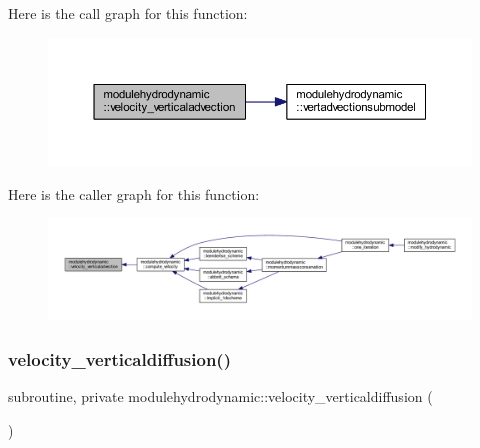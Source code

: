 Here is the call graph for this function\+:\nopagebreak
\begin{figure}[H]
\begin{center}
\leavevmode
\includegraphics[width=350pt]{namespacemodulehydrodynamic_ac07b9cc801de5e329ae0bf6d2bc4783b_cgraph}
\end{center}
\end{figure}
Here is the caller graph for this function\+:\nopagebreak
\begin{figure}[H]
\begin{center}
\leavevmode
\includegraphics[width=350pt]{namespacemodulehydrodynamic_ac07b9cc801de5e329ae0bf6d2bc4783b_icgraph}
\end{center}
\end{figure}
\mbox{\label{namespacemodulehydrodynamic_adb227f6b4fa5a958b2dd2061dbfcb22d}} 
\subsubsection{\texorpdfstring{velocity\+\_\+verticaldiffusion()}{velocity\_verticaldiffusion()}}
{\footnotesize\ttfamily subroutine, private modulehydrodynamic\+::velocity\+\_\+verticaldiffusion (\begin{DoxyParamCaption}{ }\end{DoxyParamCaption})\hspace{0.3cm}{\ttfamily [private]}}

